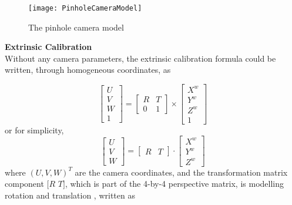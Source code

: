 \begin{figure}[h]
\centering
\texttt{[image: PinholeCameraModel]}
\caption{The pinhole camera model}
\label{PinholeCameraModel}
\end{figure}%
%
\textbf{Extrinsic Calibration}\\
Without any camera parameters, the extrinsic calibration formula could be written, through homogeneous coordinates, as

\begin{equation}
%
\left[ \begin{array}{c} U \\ V \\ W \\ 1 \end{array} \right] %
= %
\begin{bmatrix} R & T \\ 0 & 1 \end{bmatrix} \times \left[ \begin{array}{c} X^w \\ Y^w \\ Z^w \\ 1 \end{array} \right]
%
\end{equation}%
%
or for simplicity,
\begin{equation}
%
\left[ \begin{array}{c} U \\ V \\ W \end{array} \right] %
= %
\begin{bmatrix} R & T \end{bmatrix} \cdot \left[ \begin{array}{c} X^w \\ Y^w \\ Z^w \end{array} \right]
\label{extrinsicTransform}
%
\end{equation}%
%
where \((U, V, W)^T\) are the camera coordinates, and the transformation matrix component \([R\)  \(T]\), which is part of the 4-by-4 perspective matrix, is modelling rotation and translation , written as

